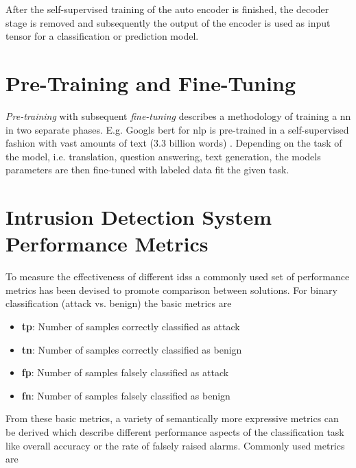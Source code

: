 After the self-supervised training of the auto encoder is finished, the decoder stage is removed and subsequently the output of the encoder is used as input tensor for a classification or prediction model. 

\section{Pre-Training and Fine-Tuning}

\textit{Pre-training} with subsequent \textit{fine-tuning} describes a methodology of training a \gls{nn} in two separate phases. E.g. Googls \gls{bert} for \gls{nlp} is pre-trained in a self-supervised fashion with vast amounts of text (3.3 billion words) \cite{bert}. Depending on the task of the model, i.e. translation, question answering, text generation, the models parameters are then fine-tuned with labeled data fit the given task.

\section{Intrusion Detection System Performance Metrics} \label{sec:backgrund:metrics}

To measure the effectiveness of different \glspl{ids} a commonly used set of performance metrics has been devised to promote comparison between solutions. For binary classification (attack vs. benign) the basic metrics are

\begin{itemize}
	\item \textbf{\gls{tp}}: Number of samples correctly classified as attack
	\item \textbf{\gls{tn}}: Number of samples correctly classified as benign
	\item \textbf{\gls{fp}}: Number of samples falsely classified as attack
	\item \textbf{\gls{fn}}: Number of samples falsely classified as benign
\end{itemize}

From these basic metrics, a variety of semantically more expressive metrics can be derived which describe different performance aspects of the classification task like overall accuracy or the rate of falsely raised alarms. Commonly used metrics are 

